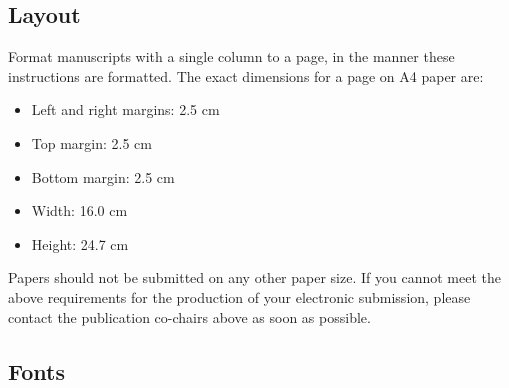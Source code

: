 \documentclass[11pt]{article}
\begin{document}
\subsection{Layout}
\label{ssec:layout}

Format manuscripts with a single column to a page, in the manner these
instructions are formatted. The exact dimensions for a page on A4
paper are:

\begin{itemize}
\item Left and right margins: 2.5 cm
\item Top margin: 2.5 cm
\item Bottom margin: 2.5 cm
\item Width: 16.0 cm
\item Height: 24.7 cm
\end{itemize}

\noindent Papers should not be submitted on any other paper size.
If you cannot meet the above requirements for
the production of your electronic submission, please contact the
publication co-chairs above as soon as possible.


\subsection{Fonts}
\end{document}
